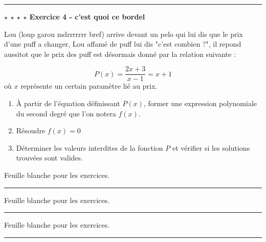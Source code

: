 \documentclass{article}
\begin{document}
	\newpage
	\rule{\textwidth}{0.4pt}
	
	\noindent \textbf{$\star$ $\star$ $\star$ $\star$ Exercice 4 - c'est quoi ce bordel}
	
	Lou (loup garou mdrrrrrrr bref) arrive devant un pelo qui lui dis que le prix d'une puff a changer, Lou affamé de puff lui dis "c'est combien ?", il repond aussitot que le prix des puff est désormais donné par la relation suivante :
	
	\[
		P(x) = \frac{2x+3}{x-1} = x+1
	\] 
	où $x$ représente un certain paramètre lié au prix.
	
	\begin{enumerate}
		\item À partir de l'équation définissant \(P(x)\), former une expression polynomiale du second degré que l'on notera \(f(x)\).
		\item Résoudre $f(x) = 0$
		\item Déterminer les valeurs interdites de la fonction \(P\) et vérifier si les solutions trouvées sont valides.
	\end{enumerate}
	
	\newpage
	\noindent Feuille blanche pour les exercices.\\
	\rule{\textwidth}{0.4pt}
	\newpage
	\noindent Feuille blanche pour les exercices.\\
	\rule{\textwidth}{0.4pt}
	\newpage
	\noindent Feuille blanche pour les exercices.\\
	\rule{\textwidth}{0.4pt}
	
	
\end{document}

